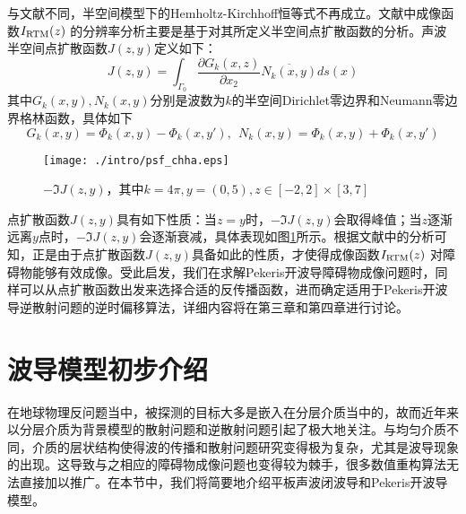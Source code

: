 与文献\cite{cch_a,cch_e,ch_e,ch_cw}不同，半空间模型下的Hemholtz-Kirchhoff恒等式不再成立。文献\cite{ch_ha}中成像函数$I_{\rm RTM}(z)$ 的分辨率分析主要是基于对其所定义半空间点扩散函数的分析。声波半空间点扩散函数$J(z,y)$定义如下：
\begin{equation}\label{psf_chha}
  J(z,y)=\int_{\Gamma_0}\frac{\partial G_{k}(x,z)}{\partial x_2}\overline{N_{k}(x,y)}ds(x)
\end{equation}
其中$G_{k}(x,y),N_{k}(x,y)$分别是波数为$k$的半空间Dirichlet零边界和Neumann零边界格林函数，具体如下
\begin{equation}
G_{k}(x,y)=\Phi_{k}(x,y)-\Phi_{k}(x,y'),\ \ N_{k}(x,y)=\Phi_{k}(x,y)+\Phi_{k}(x,y')
\end{equation}
\begin{figure}[htbp]
  \centering
  \texttt{[image: ./intro/psf\_chha.eps]}
  \caption{$-\Im J(z,y)$，其中$k=4\pi,y=(0,5),z\in[-2,2]\times[3,7]$}\label{fig_psf_chha}
\end{figure}

点扩散函数$J(z,y)$具有如下性质：当$z=y$时，$-\Im J(z,y)$会取得峰值；当$z$逐渐远离$y$点时，$-\Im J(z,y)$会逐渐衰减，具体表现如图\ref{fig_psf_chha}所示。根据文献\cite{ch_ha}中的分析可知，正是由于点扩散函数$J(z,y)$具备如此的性质，才使得成像函数$I_{\rm RTM}(z)$ 对障碍物能够有效成像。受此启发，我们在求解Pekeris开波导障碍物成像问题时，同样可以从点扩散函数出发来选择合适的反传播函数，进而确定适用于Pekeris开波导逆散射问题的逆时偏移算法，详细内容将在第三章和第四章进行讨论。

\section{波导模型初步介绍}
在地球物理反问题当中，被探测的目标大多是嵌入在分层介质当中的，故而近年来以分层介质为背景模型的散射问题和逆散射问题引起了极大地关注。与均匀介质不同，介质的层状结构使得波的传播和散射问题研究变得极为复杂，尤其是波导现象的出现。这导致与之相应的障碍物成像问题也变得较为棘手，很多数值重构算法无法直接加以推广。在本节中，我们将简要地介绍平板声波闭波导和Pekeris开波导模型。


